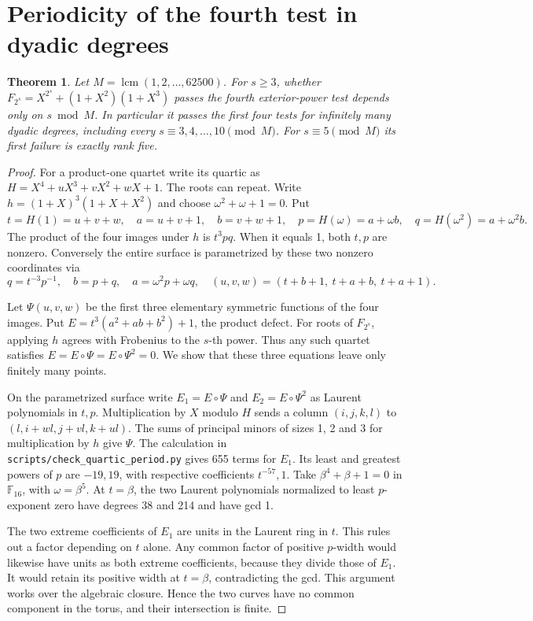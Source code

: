 \documentclass[11pt]{article}
\newtheorem{theorem}{Theorem}
\begin{document}
\section{Periodicity of the fourth test in dyadic degrees}
\begin{theorem}\label{thm:quartic-period}
Let \(M=\operatorname{lcm}(1,2,\ldots,62500)\).
For \(s\ge3\), whether \(F_{2^s}=X^{2^s}+(1+X^2)(1+X^3)\) passes
the fourth exterior-power test depends only on \(s\bmod M\).
In particular it passes the first four tests for infinitely many
dyadic degrees, including every \(s\equiv3,4,\ldots,10\pmod M\).
For \(s\equiv5\pmod M\) its first failure is exactly rank five.
\end{theorem}
\begin{proof}
For a product-one quartet write its quartic as
\(H=X^4+uX^3+vX^2+wX+1\). The roots can repeat.
Write \(h=(1+X)^3(1+X+X^2)\) and choose
\(\omega^2+\omega+1=0\). Put
\[
 t=H(1)=u+v+w,\quad a=u+v+1,\quad b=v+w+1,\quad
 p=H(\omega)=a+\omega b,\quad q=H(\omega^2)=a+\omega^2 b.
\]
The product of the four images under \(h\) is \(t^3pq\).
When it equals 1, both \(t,p\) are nonzero. Conversely the entire surface
is parametrized by these two nonzero coordinates via
\[
 q=t^{-3}p^{-1},\quad b=p+q,\quad a=\omega^2p+\omega q,\quad
 (u,v,w)=(t+b+1,\ t+a+b,\ t+a+1).
\]

Let \(\Psi(u,v,w)\) be the first three elementary symmetric functions
of the four images. Put \(E=t^3(a^2+ab+b^2)+1\), the product defect.
For roots of \(F_{2^s}\), applying \(h\) agrees with Frobenius to the
\(s\)-th power. Thus any such quartet satisfies
\(E=E\circ\Psi=E\circ\Psi^2=0\).
We show that these three equations leave only finitely many points.

On the parametrized surface write \(E_1=E\circ\Psi\) and
\(E_2=E\circ\Psi^2\) as Laurent polynomials in \(t,p\).
Multiplication by \(X\) modulo \(H\) sends a column
\((i,j,k,l)\) to \((l,i+wl,j+vl,k+ul)\).
The sums of principal minors of sizes 1, 2 and 3 for multiplication
by \(h\) give \(\Psi\).
The calculation in \texttt{scripts/check\_quartic\_period.py}
gives 655 terms for \(E_1\). Its least and greatest powers of \(p\)
are \(-19,19\), with respective coefficients \(t^{-57},1\).
Take \(\beta^4+\beta+1=0\) in \(\mathbb F_{16}\), with \(\omega=\beta^5\).
At \(t=\beta\), the two Laurent polynomials normalized to least
\(p\)-exponent zero have degrees 38 and 214 and have gcd 1.

The two extreme coefficients of \(E_1\) are units in the Laurent ring
in \(t\). This rules out a factor depending on \(t\) alone.
Any common factor of positive \(p\)-width would likewise have units
as both extreme coefficients, because they divide those of \(E_1\).
It would retain its positive width at \(t=\beta\), contradicting the gcd.
This argument works over the algebraic closure. Hence the two curves
have no common component in the torus, and their intersection is finite.


\end{proof}
\end{document}
